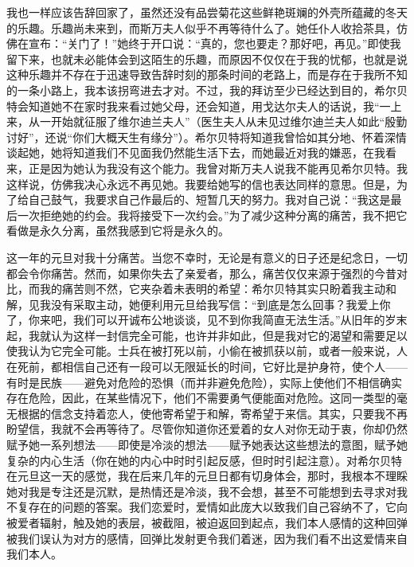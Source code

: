 \par 我也一样应该告辞回家了，虽然还没有品尝菊花这些鲜艳斑斓的外壳所蕴藏的冬天的乐趣。乐趣尚未来到，而斯万夫人似乎不再等待什么了。她任仆人收拾茶具，仿佛在宣布：“关门了！”她终于开口说：“真的，您也要走？那好吧，再见。”即使我留下来，也就未必能体会到这陌生的乐趣，而原因不仅仅在于我的忧郁，也就是说这种乐趣并不存在于迅速导致告辞时刻的那条时间的老路上，而是存在于我所不知的一条小路上，我本该拐弯进去才对。不过，我的拜访至少已经达到目的，希尔贝特会知道她不在家时我来看过她父母，还会知道，用戈达尔夫人的话说，我“一上来，从一开始就征服了维尔迪兰夫人”（医生夫人从未见过维尔迪兰夫人如此“殷勤讨好”，还说“你们大概天生有缘分”）。希尔贝特将知道我曾恰如其分地、怀着深情谈起她，她将知道我们不见面我仍然能生活下去，而她最近对我的嫌恶，在我看来，正是因为她认为我没有这个能力。我曾对斯万夫人说我不能再见希尔贝特。我这样说，仿佛我决心永远不再见她。我要给她写的信也表达同样的意思。但是，为了给自己鼓气，我要求自己作最后的、短暂几天的努力。我对自己说：“我这是最后一次拒绝她的约会。我将接受下一次约会。”为了减少这种分离的痛苦，我不把它看做是永久分离，虽然我感到它将是永久的。
\par 这一年的元旦对我十分痛苦。当您不幸时，无论是有意义的日子还是纪念日，一切都会令你痛苦。然而，如果你失去了亲爱者，那么，痛苦仅仅来源于强烈的今昔对比，而我的痛苦则不然，它夹杂着未表明的希望：希尔贝特其实只盼着我主动和解，见我没有采取主动，她便利用元旦给我写信：“到底是怎么回事？我爱上你了，你来吧，我们可以开诚布公地谈谈，见不到你我简直无法生活。”从旧年的岁末起，我就认为这样一封信完全可能，也许并非如此，但是我对它的渴望和需要足以使我认为它完全可能。士兵在被打死以前，小偷在被抓获以前，或者一般来说，人在死前，都相信自己还有一段可以无限延长的时间，它好比是护身符，使个人——有时是民族——避免对危险的恐惧（而并非避免危险），实际上使他们不相信确实存在危险，因此，在某些情况下，他们不需要勇气便能面对危险。这同一类型的毫无根据的信念支持着恋人，使他寄希望于和解，寄希望于来信。其实，只要我不再盼望信，我就不会再等待了。尽管你知道你还爱着的女人对你无动于衷，你却仍然赋予她一系列想法——即使是冷淡的想法——赋予她表达这些想法的意图，赋予她复杂的内心生活（你在她的内心中时时引起反感，但时时引起注意）。对希尔贝特在元旦这一天的感觉，我在后来几年的元旦日都有切身体会，那时，我根本不理睬她对我是专注还是沉默，是热情还是冷淡，我不会想，甚至不可能想到去寻求对我不复存在的问题的答案。我们恋爱时，爱情如此庞大以致我们自己容纳不了，它向被爱者辐射，触及她的表层，被截阻，被迫返回到起点，我们本人感情的这种回弹被我们误认为对方的感情，回弹比发射更令我们着迷，因为我们看不出这爱情来自我们本人。
